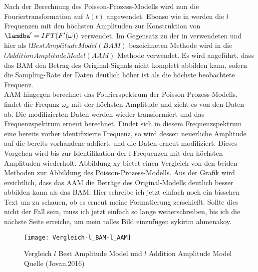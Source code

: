 Nach der Berechnung des Poisson-Prozess-Modells wird nun die Fouriertransformation auf $\lambda (t)$ angewendet. Ebenso wie in \cite{Krajnik.2014} werden die $l$ Frequenzen mit den höchsten Amplituden zur Konstruktion von $\lamdba ' = IFT(F'(\omega))$ verwendet. Im Gegensatz zu der in \cite{Krajnik.2014} verwendeten und hier als $l Best Amplitude Model (BAM)$ bezeichneten Methode wird in \cite{Jovan.2016} die $l Addition Amplitude Model (AAM)$ Methode verwendet. Es wird angeführt, dass das BAM den Betrag des Original-Signals nicht komplett abbilden kann, sofern die Sampling-Rate der Daten deutlich höher ist als die höchste beobachtete Frequenz. \\ AAM hingegen berechnet das Fourierspektrum der Poisson-Prozess-Modells, findet die Frequnz $\omega_k$ mit der höchsten Amplitude und zieht es von den Daten ab. Die modifizierten Daten werden wieder transformiert und das Frequenzspektrum erneut berechnet. Findet sich in diesem Frequenzspektrum eine bereits vorher identifizierte Frequenz, so wird dessen neuerliche Amplitude auf die bereits vorhandene addiert, und die Daten erneut modifiziert. Dieses Vorgehen wird bis zur Identifikation der l Frequenzen mit den höchsten Amplituden wiederholt. Abbildung xy bietet einen Vergleich von den beiden Methoden zur Abbildung des Poisson-Prozess-Modells. Aus der Grafik wird ersichtlich, dass das AAM die Beträge des Original-Modells deutlich besser abbilden kann als das BAM. Hier schreibe ich jetzt einfach noch ein bisschen Text um zu schauen, ob es erneut meine Formatierung zerschießt.
Sollte dies nicht der Fall sein, muss ich jetzt einfach so lange weiterschreiben, bis ich die nächste Seite erreiche, um mein tolles Bild einzufügen sykirim ahmenakoy.
\begin{figure}[!ht]
	\begin{center}
		\texttt{[image: Vergleich-l\_BAM-l\_AAM]}
		\caption{Vergleich $l$ Best Amplitude Model und $l$ Addition Amplitude Model Quelle (Jovan.2016)}
		\label{fig.BAM_AAM_Vergleich}
	\end{center}
\end{figure}

